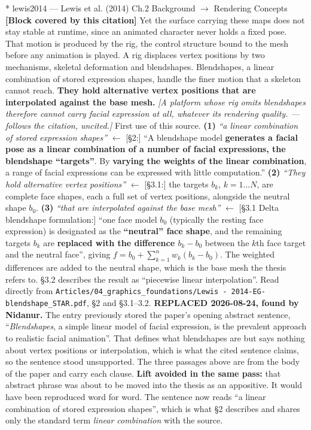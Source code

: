 \documentclass[11pt, a4paper]{article}
\makeatletter
\newcounter{citentry}
\newcommand{\citentry@core}[7]{%
  \stepcounter{citentry}
  \begingroup
  \sbox{\citentry@measurebox}{%
    \begin{minipage}{\linewidth}
      \noindent\colorbox{konstanzblue}{\parbox{\dimexpr\linewidth-2\fboxsep}{%
        \vspace{3pt}
        \textbf{\#\thecitentry \quad #2} \hfill \textit{#3}
        \vspace{3pt}
      }}
      \vspace{3pt}
      \noindent\begin{tabular}{@{}p{2.7cm} p{\dimexpr\linewidth-3cm}@{}}
        \textit{\small Sentence in thesis:} & #4 \\[5pt]
        \textbf{Usage:}\hfill       & #5 \\[5pt]
        \textit{\small Original source:}     & #6 \\[5pt]
        \textbf{How to check:}             & #7 \\
      \end{tabular}
      \vspace{5pt}
      \rule{10pt}{10pt}\quad \textbf{Validated} --- I have read the original and agree it supports the sentence.
    \end{minipage}%
  }%
  \Needspace{\dimexpr\ht\citentry@measurebox+\dp\citentry@measurebox\relax}%
  \endgroup
  \vspace{10pt}
  \noindent\colorbox{konstanzblue}{\parbox{\dimexpr\linewidth-2\fboxsep}{%
    \vspace{3pt}
    \textcolor{white}{\textbf{\#\thecitentry \quad #2}} \hfill \textcolor{white}{\textit{#3}}
    \vspace{3pt}
  }}
  \vspace{3pt}
  \noindent\begin{tabular}{@{}p{2.7cm} p{\dimexpr\linewidth-3cm}@{}}
    \textit{\small Sentence in thesis:} & \textcolor{darkgreen}{#4} \\[5pt]
    \textbf{Usage:}\hfill       & #5 \\[5pt]
    \textit{\small Original source:}     & \textcolor{darkred}{#6} \\[5pt]
    \textbf{How to check:}             & #7 \\
  \end{tabular}
  \vspace{5pt}
  \noindent\CheckBox[name=verified\thecitentry, width=10pt, height=10pt, bordercolor={0 0 0}, borderwidth=0.75, backgroundcolor={1 1 1}#1]{}\quad \textbf{Validated} --- I have read the original and agree it supports the sentence.
  \vspace{3pt}
  \noindent\textcolor{midgray}{\rule{\linewidth}{0.4pt}}
}
\newcommand{\citentry}{\@ifstar{\citentry@core{, checked}}{\citentry@core{}}}
\makeatother
\begin{document}
\begin{Form}
\citentry*
  {lewis2014 --- Lewis et al. (2014)}
  {Ch.2 Background $\rightarrow$ Rendering Concepts}
  {\textbf{[Block covered by this citation]} Yet the surface carrying these maps does not stay stable at runtime, since an animated character never holds a fixed pose. That motion is produced by the rig, the control structure bound to the mesh before any animation is played. A rig displaces vertex positions by two mechanisms, skeletal deformation and blendshapes. Blendshapes, a linear combination of stored expression shapes, handle the finer motion that a skeleton cannot reach. \textbf{They hold alternative vertex positions that are interpolated against the base mesh.} \emph{[A platform whose rig omits blendshapes therefore cannot carry facial expression at all, whatever its rendering quality. --- follows the citation, uncited.]}}
  {First use of this source.}
  {\textbf{(1)} \emph{``a linear combination of stored expression shapes''} $\leftarrow$ [\S2:] ``A blendshape model \textbf{generates a facial pose as a linear combination of a number of facial expressions, the blendshape ``targets''}. By \textbf{varying the weights of the linear combination}, a range of facial expressions can be expressed with little computation.'' \quad \textbf{(2)} \emph{``They hold alternative vertex positions''} $\leftarrow$ [\S3.1:] the targets $b_k$, $k = 1 \ldots N$, are complete face shapes, each a full set of vertex positions, alongside the neutral shape $b_0$. \quad \textbf{(3)} \emph{``that are interpolated against the base mesh''} $\leftarrow$ [\S3.1 Delta blendshape formulation:] ``one face model $b_0$ (typically the resting face expression) is designated as the \textbf{``neutral'' face shape}, and the remaining targets $b_k$ are \textbf{replaced with the difference $b_k - b_0$} between the $k$th face target and the neutral face'', giving $f = b_0 + \sum_{k=1}^{n} w_k (b_k - b_0)$. The weighted differences are added to the neutral shape, which is the base mesh the thesis refers to. \S3.2 describes the result as ``piecewise linear interpolation''.}
  {Read directly from \texttt{\footnotesize Articles/04\_graphics\_foundations/Lewis - 2014-EG-blendshape\_STAR.pdf}, \S2 and \S3.1--3.2. \textbf{REPLACED 2026-08-24, found by Nidanur.} The entry previously stored the paper's opening abstract sentence, ``\emph{Blendshapes}, a simple linear model of facial expression, is the prevalent approach to realistic facial animation''. That defines what blendshapes are but says nothing about vertex positions or interpolation, which is what the cited sentence claims, so the sentence stood unsupported. The three passages above are from the body of the paper and carry each clause. \textbf{Lift avoided in the same pass:} that abstract phrase was about to be moved into the thesis as an appositive. It would have been reproduced word for word. The sentence now reads ``a linear combination of stored expression shapes'', which is what \S2 describes and shares only the standard term \emph{linear combination} with the source.}


\end{Form}
\end{document}
